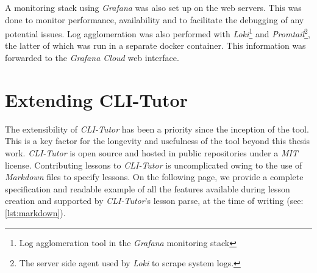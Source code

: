 A monitoring stack using \textit{Grafana} was also set up on the web servers.
This was done to monitor performance, availability and to facilitate
the debugging of any potential issues. Log agglomeration was also performed
with \textit{Loki}\footnote{Log agglomeration tool in the \textit{Grafana}
monitoring stack} and \textit{Promtail}\footnote{The server side agent used by 
    \textit{Loki} to scrape system logs.}, the latter of which was run in a
    separate docker container. This information was forwarded to the
    \textit{Grafana Cloud} web interface.

\section{Extending CLI-Tutor}

The extensibility of \textit{CLI-Tutor} has been a priority since the inception
of the tool. This is a key factor for the longevity and usefulness of the tool
beyond this thesis work. \textit{CLI-Tutor} is open source and hosted in public
repositories under a \textit{MIT}\cite{mitlicense} license. Contributing
lessons to \textit{CLI-Tutor} is uncomplicated owing to the use of
\textit{Markdown} files to specify lessons. On the following page, we provide a
complete specification and readable example of all the features available
during lesson creation and supported by \textit{CLI-Tutor}'s lesson parse, at
the time of writing (see: \autoref{lst:markdown}).


